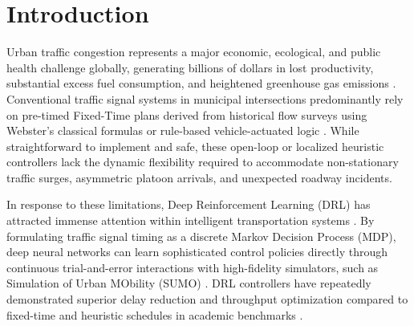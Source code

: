 \documentclass{ieeeaccess}
\begin{document}
\section{Introduction}
\label{sec:introduction}
Urban traffic congestion represents a major economic, ecological, and public health challenge globally, generating billions of dollars in lost productivity, substantial excess fuel consumption, and heightened greenhouse gas emissions \cite{lopez2018microscopic, ault2021reinforcement}. Conventional traffic signal systems in municipal intersections predominantly rely on pre-timed Fixed-Time plans derived from historical flow surveys using Webster's classical formulas \cite{webster1958traffic} or rule-based vehicle-actuated logic \cite{koonce2008traffic}. While straightforward to implement and safe, these open-loop or localized heuristic controllers lack the dynamic flexibility required to accommodate non-stationary traffic surges, asymmetric platoon arrivals, and unexpected roadway incidents.

In response to these limitations, Deep Reinforcement Learning (DRL) has attracted immense attention within intelligent transportation systems \cite{wei2018intellilight, wei2019presslight, chen2020toward, ault2021reinforcement}. By formulating traffic signal timing as a discrete Markov Decision Process (MDP), deep neural networks can learn sophisticated control policies directly through continuous trial-and-error interactions with high-fidelity simulators, such as Simulation of Urban MObility (SUMO) \cite{lopez2018microscopic}. DRL controllers have repeatedly demonstrated superior delay reduction and throughput optimization compared to fixed-time and heuristic schedules in academic benchmarks \cite{ault2021reinforcement, vidali2020deeprl}.
\end{document}
